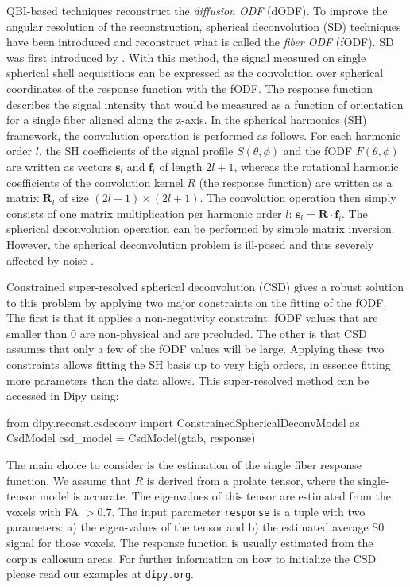 \documentclass{bioinfo}
\begin{document}
QBI-based techniques reconstruct the \emph{diffusion
  ODF} (dODF). To improve the angular resolution of the reconstruction, spherical
deconvolution (SD) techniques have been introduced and reconstruct what is
called the \emph{fiber ODF} (fODF).
SD was first introduced by \citet{tournier-calamante-etal:04}. With
this method, the signal measured on single spherical shell
acquisitions can be expressed as the convolution over spherical coordinates of
the response function with the fODF. The response
function describes the signal intensity that would be measured as a function of
orientation for a single fiber aligned along the z-axis. In the spherical
harmonics (SH) framework, the convolution operation is performed as
follows. For each harmonic order $l$, the SH coefficients of the signal profile
$S(\theta, \phi)$ and the fODF $F(\theta, \phi)$ are written as vectors
$\mathbf{s}_l$ and $\mathbf{f}_l$ of length $2l+1$, whereas the rotational
harmonic coefficients of the convolution kernel $R$ (the response function) are
written as a matrix $\mathbf{R}_l$ of size $(2l+ 1)\times(2l+ 1)$. The
convolution operation then simply consists of one matrix multiplication per
harmonic order $l$: $\mathbf{s}_l=\mathbf{R}\cdot\mathbf{f}_l$. The spherical
deconvolution operation can be performed by simple matrix inversion. However,
the spherical deconvolution problem is ill-posed and thus severely affected by
noise \citep{tournier-calamante-etal:04}.

Constrained super-resolved spherical deconvolution (CSD)
\citet{tournier-calamante-etal:07} gives a robust solution to this problem by
applying two major constraints on the fitting of the fODF. The first is that it
applies a non-negativity constraint: fODF values that are smaller than 0 are
non-physical and are precluded. The other is that CSD assumes that only a few of
the fODF values will be large. Applying these two constraints allows fitting the
SH basis up to very high orders, in essence fitting more parameters than the data
allows.
This super-resolved method can be accessed in Dipy using:
\begin{python}
from dipy.reconst.csdeconv import
        ConstrainedSphericalDeconvModel as CsdModel
csd_model = CsdModel(gtab, response)
\end{python}
The main choice to consider is the estimation of the single fiber response
function.  We assume that $R$ is derived from a prolate tensor, where
the single-tensor model is accurate. The eigenvalues
of this tensor are estimated from the voxels with FA $> 0.7$. The input
parameter \texttt{response} is a tuple with two parameters: a) the eigen-values
of the tensor and b) the estimated average S0 signal for those voxels. The
response function is usually estimated from the corpus callosum areas. For
further information on how to initialize the CSD please read our examples at
\texttt{dipy.org}.
\end{document}
